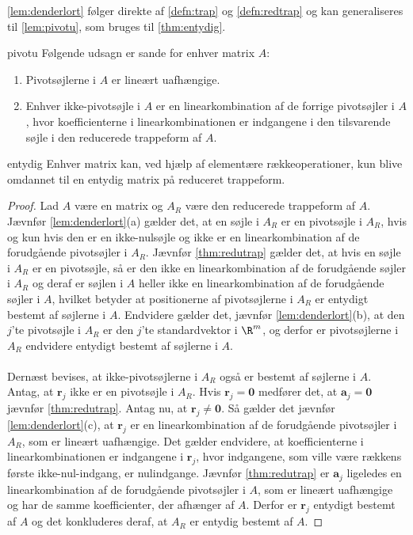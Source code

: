 \noindent
%
\ref{lem:denderlort} følger direkte af \ref{defn:trap} og \ref{defn:redtrap}
og kan generaliseres til \ref{lem:pivotu}, som bruges til \ref{thm:entydig}.
%
\begin{lem}{}{pivotu}
Følgende udsagn er sande for enhver matrix $A$: 
\begin{enumerate}[label=(\alph*)]
\item Pivotsøjlerne i $A$ er lineært uafhængige. 
\item Enhver ikke-pivotsøjle i $A$ er en linearkombination af de forrige pivotsøjler i $A$, hvor koefficienterne i linearkombinationen er indgangene i den tilsvarende søjle i den reducerede trappeform af $A$. 
\end{enumerate} 
\end{lem}
%
\begin{thm}{}{entydig}
Enhver matrix kan, ved hjælp af elementære rækkeoperationer, kun blive omdannet til en entydig matrix på reduceret trappeform.
\end{thm}
%
\begin{proof}
Lad $A$ være en matrix og $A_R$ være den reducerede trappeform af $A$. 
Jævnfør \ref{lem:denderlort}(a) gælder det, at en søjle i $A_R$ er en pivotsøjle i $A_R$, hvis og kun hvis den er en ikke-nulsøjle og ikke er en linearkombination af de forudgående pivotsøjler i $A_R$. 
Jævnfør \ref{thm:redutrap} gælder det, at hvis en søjle i $A_R$ er en pivotsøjle, så er den ikke en linearkombination af de forudgående søjler i $A_R$ og deraf er søjlen i $A$ heller ikke en linearkombination af de forudgående  søjler i $A$, hvilket betyder at positionerne af pivotsøjlerne i $A_R$ er entydigt bestemt af søjlerne i $A$. 
Endvidere gælder det, jævnfør \ref{lem:denderlort}(b), at den $j$'te pivotsøjle i $A_R$ er den $j$'te standardvektor i $\R^m$, og derfor er pivotsøjlerne i $A_R$ endvidere entydigt bestemt af søjlerne i $A$. \\\\
Dernæst bevises, at ikke-pivotsøjlerne i $A_R$ også er bestemt af søjlerne i $A$. 
Antag, at $\textbf{r}_j$ ikke er en pivotsøjle i $A_R$.
Hvis $\textbf{r}_j = \textbf{0}$ medfører det, at $\textbf{a}_j = \textbf{0}$ jævnfør \ref{thm:redutrap}. 
Antag nu, at $\textbf{r}_j \neq \textbf{0}$.
Så gælder det jævnfør \ref{lem:denderlort}(c), at $\textbf{r}_j$ er en linearkombination af de forudgående pivotsøjler i $A_R$, som er lineært uafhængige. 
Det gælder endvidere, at koefficienterne i linearkombinationen er indgangene i $\textbf{r}_j$, hvor indgangene, som ville være rækkens første ikke-nul-indgang, er nulindgange.
Jævnfør \ref{thm:redutrap} er $\textbf{a}_j$ ligeledes en linearkombination af de forudgående pivotsøjler i $A$, som er lineært uafhængige og har de samme koefficienter, der afhænger af $A$. 
Derfor er $\textbf{r}_j$ entydigt bestemt af $A$ og det konkluderes deraf, at $A_R$ er entydig bestemt af $A$. 
\end{proof}